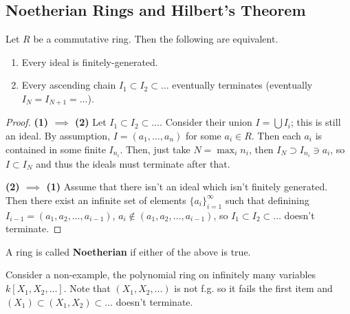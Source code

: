 \subsection{Noetherian Rings and Hilbert's Theorem}
\begin{theorem}
    Let $R$ be a commutative ring. Then the following are equivalent.
    \begin{enumerate}
        \item Every ideal is finitely-generated.
        \item Every ascending chain $I_1 \subset I_2 \subset \dots$ eventually terminates (eventually $I_N = I_{N + 1} = \dots$).
    \end{enumerate}
    \begin{proof}
        \textbf{(1) $\implies$ (2)}
        Let $I_1 \subset I_2 \subset \dots$. Consider their union $I = \bigcup I_i$;
        this is still an ideal. By assumption, $I = (a_1, \dots, a_n)$ for some $a_i \in R$. Then each $a_i$ is contained in
        some finite $I_{n_i}$. Then, just take $N = \max_i n_i$, then $I_N \supset I_{n_i} \ni a_i$, so $I \subset I_N$
        and thus the ideals must terminate after that.

        \textbf{(2) $\implies$ (1)}
        Assume that there isn't an ideal which isn't finitely generated. Then there exist an infinite set of elements
        $\{a_i\}_{i =1}^{\infty}$ such that definining $I_{i - 1} = (a_1, a_2, \dots, a_{i - 1})$,
        $a_i \notin (a_1, a_2, \dots, a_{i - 1})$, so $I_1 \subset I_2 \subset \dots$ doesn't terminate.
    \end{proof}
\end{theorem}
\begin{definition}
    A ring is called \textbf{Noetherian} if either of the above is true.
\end{definition}
\begin{example}
    Consider a non-example, the polynomial ring on infinitely many variables $k[X_1, X_2, \dots]$. Note that $(X_1, X_2, \dots)$ is
    not f.g. so it fails the first item and $(X_1) \subset (X_1, X_2) \subset \dots$ doesn't terminate.
\end{example}

